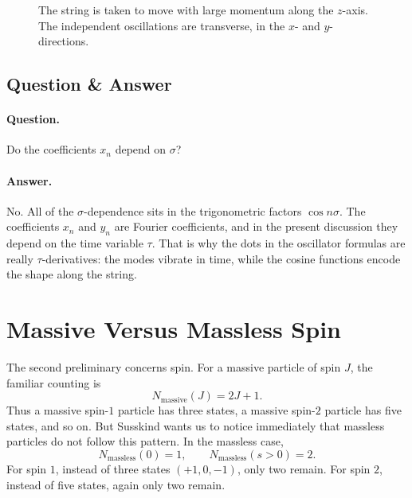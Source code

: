 \begin{figure}[t]
\centering
{}
\caption{The string is taken to move with large momentum along the \(z\)-axis. The independent oscillations are transverse, in the \(x\)- and \(y\)-directions.}
\end{figure}

\subsection{Question \& Answer}

\paragraph{Question.} Do the coefficients \(x_n\) depend on \(\sigma\)?

\paragraph{Answer.} No. All of the \(\sigma\)-dependence sits in the trigonometric factors \(\cos n\sigma\). The coefficients \(x_n\) and \(y_n\) are Fourier coefficients, and in the present discussion they depend on the time variable \(\tau\). That is why the dots in the oscillator formulas are really \(\tau\)-derivatives: the modes vibrate in time, while the cosine functions encode the shape along the string.

\section{Massive Versus Massless Spin}

The second preliminary concerns spin. For a massive particle of spin \(J\), the familiar counting is
\begin{equation}
N_{\mathrm{massive}}(J)=2J+1.
\end{equation}
Thus a massive spin-\(1\) particle has three states, a massive spin-\(2\) particle has five states, and so on. But Susskind wants us to notice immediately that massless particles do not follow this pattern. In the massless case,
\begin{equation}
N_{\mathrm{massless}}(0)=1,\qquad N_{\mathrm{massless}}(s>0)=2.
\end{equation}
For spin \(1\), instead of three states \((+1,0,-1)\), only two remain. For spin \(2\), instead of five states, again only two remain.

